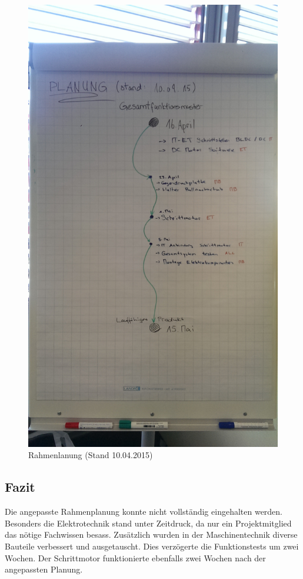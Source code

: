 \begin{figure}[h!]
	\centering
	\includegraphics[width=0.6\linewidth]{../../fig/rahmenplanung-10042015}
	\caption{Rahmenlanung (Stand 10.04.2015)}
	\label{fig:rahmenplanung-10042015}
\end{figure}

\subsection{Fazit}

Die angepasste Rahmenplanung konnte nicht vollständig eingehalten werden. Besonders die Elektrotechnik stand unter Zeitdruck, da nur ein Projektmitglied das nötige Fachwissen besass.
Zusätzlich wurden in der Maschinentechnik diverse Bauteile verbessert und ausgetauscht. Dies verzögerte die Funktionstests um zwei Wochen.
Der Schrittmotor funktionierte ebenfalls zwei Wochen nach der angepassten Planung.
